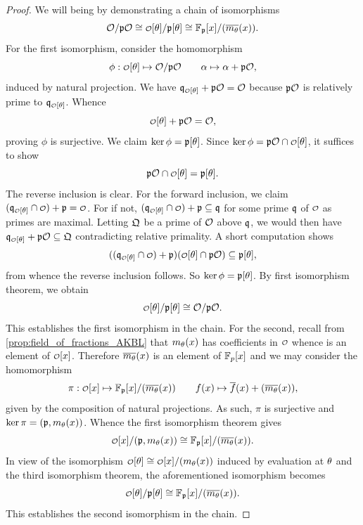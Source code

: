     \begin{proof}
      We will being by demonstrating a chain of isomorphisms
      \[
        \mc{O}/\mf{p}\mc{O} \cong \smc{O}[\t]/\mf{p}[\t] \cong \F_{\mf{p}}[x]/(\conj{m_{\t}}(x)).
      \]
      For the first isomorphism, consider the homomorphism
      \[
        \phi:\smc{O}[\t] \mapsto \mc{O}/\mf{p}\mc{O} \qquad \a \mapsto \a+\mf{p}\mc{O},
      \]
      induced by natural projection. We have \(\mf{q}_{\smc{O}[\t]}+\mf{p}\mc{O} = \mc{O}\) because \(\mathfrak{p}\mathcal{O}\) is relatively prime to \(\mf{q}_{\smc{O}[\t]}\). Whence
      \[
        \smc{O}[\t]+\mf{p}\mc{O} = \mc{O},
      \]
      proving \(\phi\) is surjective. We claim \(\ker\phi = \mathfrak{p}[\theta]\). Since \(\ker\phi = \mf{p}\mc{O} \cap \smc{O}[\t]\), it suffices to show
      \[
        \mf{p}\mc{O} \cap \smc{O}[\t] = \mf{p}[\t].
      \]
      The reverse inclusion is clear. For the forward inclusion, we claim \((\mf{q}_{\smc{O}[\t]} \cap \smc{O})+\mf{p} = \smc{O}\). For if not, \((\mf{q}_{\smc{O}[\t]} \cap \smc{O})+\mf{p} \subseteq \mf{q}\) for some prime \(\mathfrak{q}\) of \(\smc{O}\) as primes are maximal. Letting \(\mathfrak{Q}\) be a prime of \(\mathcal{O}\) above \(\mathfrak{q}\), we would then have \(\mf{q}_{\smc{O}[\t]}+\mf{p}\mc{O} \subseteq \mf{Q}\) contradicting relative primality. A short computation shows
      \[
        ((\mf{q}_{\smc{O}[\t]} \cap \smc{O})+\mf{p})(\smc{O}[\t] \cap \mf{p}\mc{O}) \subseteq \mf{p}[\t],
      \]
      from whence the reverse inclusion follows. So \(\ker\phi = \mathfrak{p}[\theta]\). By first isomorphism theorem, we obtain
      \[
        \smc{O}[\t]/\mf{p}[\t] \cong \mc{O}/\mf{p}\mc{O}.
      \]
      This establishes the first isomorphism in the chain. For the second, recall from \cref{prop:field_of_fractions_AKBL} that \(m_{\theta}(x)\) has coefficients in \(\smc{O}\) whence is an element of \(\smc{O}[x]\). Therefore \(\overline{m_{\theta}}(x)\) is an element of \(\mathbb{F}_{p}[x]\) and we may consider the homomorphism
      \[
        \pi:\smc{O}[x] \mapsto \F_{\mf{p}}[x]/(\conj{m_{\t}}(x)) \qquad f(x) \mapsto \conj{f}(x)+(\conj{m_{\t}}(x)),
      \]
      given by the composition of natural projections. As such, \(\pi\) is surjective and \(\ker\pi = (\mathfrak{p},m_{\theta}(x))\). Whence the first isomorphism theorem gives
      \[
        \smc{O}[x]/(\mf{p},m_{\t}(x)) \cong \F_{\mf{p}}[x]/(\conj{m_{\t}}(x)).
      \]
      In view of the isomorphism \(\smc{O}[\t] \cong \smc{O}[x]/(m_{\t}(x))\) induced by evaluation at \(\theta\) and the third isomorphism theorem, the aforementioned isomorphism becomes
      \[
        \smc{O}[\t]/\mf{p}[\t] \cong \F_{\mf{p}}[x]/(\conj{m_{\t}}(x)).
      \]
      This establishes the second isomorphism in the chain.
      

\end{proof}
